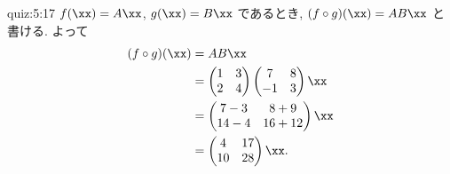 \begin{answerof}{quiz:5:17}
  $f(\xx)=A\xx$, $g(\xx)=B\xx$
  であるとき, $(f\circ g)(\xx)=AB\xx$
  と書ける. よって
  \begin{align*}
    (f\circ g)(\xx)
    &=AB\xx\\
    &=\begin{pmatrix}1&3\\2&4\end{pmatrix}\begin{pmatrix}7&8\\-1&3\end{pmatrix}\xx\\
    &=\begin{pmatrix}7-3&8+9\\14-4&16+12\end{pmatrix}\xx\\
    &=\begin{pmatrix}4&17\\10&28\end{pmatrix}\xx.
  \end{align*}
  

\end{answerof}
